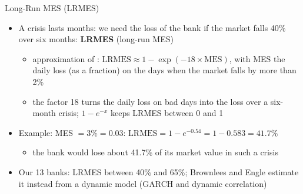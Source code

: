 \begin{frame}{Long-Run MES (LRMES)}
\itemsize{\small}
\begin{itemize}
    \item A crisis lasts months: we need the loss of the bank if the market falls 40\% over six months: \textbf{LRMES} (long-run MES)
    \begin{itemize}
        \item approximation of : $\mathrm{LRMES} \approx 1 - \exp(-18 \times \mathrm{MES})$, with MES the daily loss (as a fraction) on the days when the market falls by more than 2\%
        \item the factor 18 turns the daily loss on bad days into the loss over a six-month crisis; $1 - e^{-x}$ keeps LRMES between 0 and 1
    \end{itemize}
    \item Example: MES $= 3\% = 0.03$: $\mathrm{LRMES} = 1 - e^{-0.54} = 1 - 0.583 = 41.7\%$
    \begin{itemize}
        \item the bank would lose about 41.7\% of its market value in such a crisis
    \end{itemize}
    \item Our 13 banks: LRMES between 40\% and 65\%; Brownlees and Engle estimate it instead from a dynamic model (GARCH and dynamic correlation) 
\end{itemize}
\end{frame}


